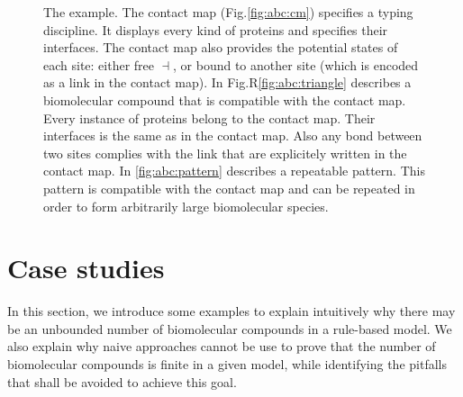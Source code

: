 \documentclass{entcs}
\newcommand{\freesymbol}{\dashv}
\begin{document}
\begin{figure}
\caption{The  example.
The contact map  (Fig.\ref{fig:abc:cm}) specifies a typing discipline.
It displays every kind of proteins and specifies their interfaces.
The contact map also provides the potential states of each site:
either free $\freesymbol$, or bound to another site (which is encoded as a link in the contact map).
In Fig.R\ref{fig:abc:triangle} describes a biomolecular compound that is compatible with the contact map. Every instance of proteins belong to the contact map. Their interfaces is the same as in the contact map.
Also any bond between two sites complies with the link that are explicitely written in the contact map.
In \ref{fig:abc:pattern} describes a repeatable pattern.
This pattern is compatible with the contact map and can be repeated in order to form arbitrarily large biomolecular species.
}
\end{figure}
\section{Case studies}
\label{sec:case-study}

In this section, we introduce some examples to explain intuitively why there may be an unbounded number of biomolecular compounds in a rule-based model.  We also explain why naive approaches cannot be use to prove that the number of biomolecular compounds is finite in a given model,  while identifying the pitfalls that shall be avoided to achieve this goal.
\end{document}

